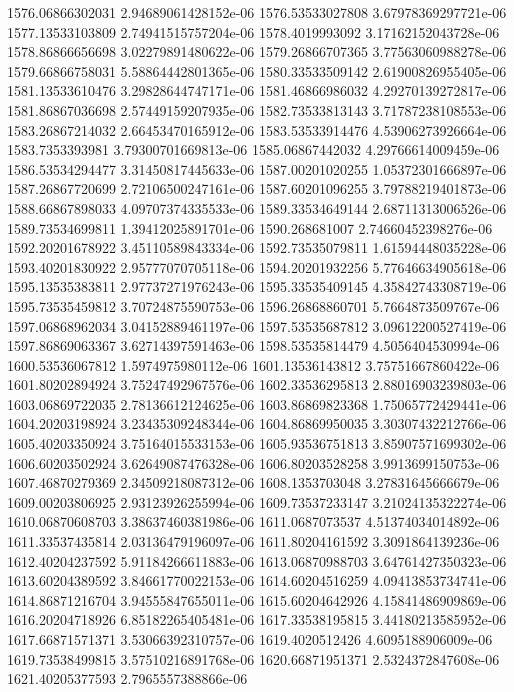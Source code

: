 {1576.06866302031 2.94689061428152e-06
1576.53533027808 3.67978369297721e-06
1577.13533103809 2.74941515757204e-06
1578.4019993092 3.17162152043728e-06
1578.86866656698 3.02279891480622e-06
1579.26866707365 3.77563060988278e-06
1579.66866758031 5.58864442801365e-06
1580.33533509142 2.61900826955405e-06
1581.13533610476 3.29828644747171e-06
1581.46866986032 4.29270139272817e-06
1581.86867036698 2.57449159207935e-06
1582.73533813143 3.71787238108553e-06
1583.26867214032 2.66453470165912e-06
1583.53533914476 4.53906273926664e-06
1583.7353393981 3.79300701669813e-06
1585.06867442032 4.29766614009459e-06
1586.53534294477 3.31450817445633e-06
1587.00201020255 1.05372301666897e-06
1587.26867720699 2.72106500247161e-06
1587.60201096255 3.79788219401873e-06
1588.66867898033 4.09707374335533e-06
1589.33534649144 2.68711313006526e-06
1589.73534699811 1.39412025891701e-06
1590.268681007 2.74660452398276e-06
1592.20201678922 3.45110589843334e-06
1592.73535079811 1.61594448035228e-06
1593.40201830922 2.95777070705118e-06
1594.20201932256 5.77646634905618e-06
1595.13535383811 2.97737271976243e-06
1595.33535409145 4.35842743308719e-06
1595.73535459812 3.70724875590753e-06
1596.26868860701 5.7664873509767e-06
1597.06868962034 3.04152889461197e-06
1597.53535687812 3.09612200527419e-06
1597.86869063367 3.62714397591463e-06
1598.53535814479 4.5056404530994e-06
1600.53536067812 1.5974975980112e-06
1601.13536143812 3.75751667860422e-06
1601.80202894924 3.75247492967576e-06
1602.33536295813 2.88016903239803e-06
1603.06869722035 2.78136612124625e-06
1603.86869823368 1.75065772429441e-06
1604.20203198924 3.23435309248344e-06
1604.86869950035 3.30307432212766e-06
1605.40203350924 3.75164015533153e-06
1605.93536751813 3.85907571699302e-06
1606.60203502924 3.62649087476328e-06
1606.80203528258 3.9913699150753e-06
1607.46870279369 2.34509218087312e-06
1608.1353703048 3.27831645666679e-06
1609.00203806925 2.93123926255994e-06
1609.73537233147 3.21024135322274e-06
1610.06870608703 3.38637460381986e-06
1611.0687073537 4.51374034014892e-06
1611.33537435814 2.03136479196097e-06
1611.80204161592 3.3091864139236e-06
1612.40204237592 5.91184266611883e-06
1613.06870988703 3.64761427350323e-06
1613.60204389592 3.84661770022153e-06
1614.60204516259 4.09413853734741e-06
1614.86871216704 3.94555847655011e-06
1615.60204642926 4.15841486909869e-06
1616.20204718926 6.85182265405481e-06
1617.33538195815 3.44180213585952e-06
1617.66871571371 3.53066392310757e-06
1619.4020512426 4.6095188906009e-06
1619.73538499815 3.57510216891768e-06
1620.66871951371 2.5324372847608e-06
1621.40205377593 2.7965557388866e-06
}
